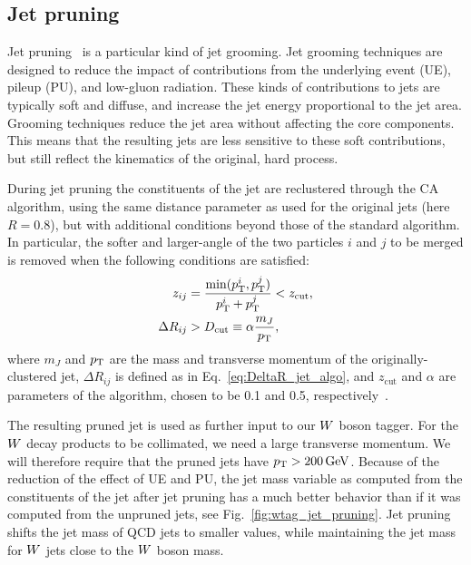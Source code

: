 
\subsection{Jet pruning}

Jet pruning~\cite{Ellis:2009su,Ellis:2009me} is a particular kind of jet grooming. Jet grooming
techniques are designed to reduce the impact of contributions from the underlying event (UE), pileup
(PU), and low-\pt gluon radiation. These kinds of contributions to jets are typically soft and
diffuse, and increase the jet energy proportional to the jet area. Grooming techniques reduce the
jet area without affecting the core components. This means that the resulting jets are less
sensitive to these soft contributions, but still reflect the kinematics of the original, hard
process.


During jet pruning the constituents of the jet are reclustered through the CA algorithm, using the
same distance parameter as used for the original jets (here $R=0.8$), but with additional conditions
beyond those of the standard algorithm.
In particular, the softer and larger-angle of the two particles $i$ and $j$ to be merged is removed
when the following conditions are satisfied:
\begin{align}
  z_{ij} &= \frac{\min( p_{\mathrm{T}}^i , p_{\mathrm{T}}^j )}{p_{\mathrm{T}}^i + p_{\mathrm{T}}^j} < z_{\textrm{cut}}, \\
  \Delta R_{ij} &> D_{\textrm{cut}} \equiv \alpha \frac{m_J}{p_{\mathrm{T}}} ,
\end{align}
where $m_J$ and $p_{\mathrm{T}}$ are the mass and transverse momentum of the originally-clustered jet, $\Delta
R_{ij}$ is defined as in Eq.~\ref{eq:DeltaR_jet_algo}, and
$z_\textrm{cut}$ and $\alpha$ are parameters of the algorithm, chosen to be 0.1 and 0.5,
respectively~\cite{Chatrchyan:2013vbb}. 

The resulting pruned jet is used as further input to our $W$ boson tagger. For the $W$ decay
products to be collimated, we need a large transverse momentum. We will therefore require that the
pruned jets have $p_{\mathrm{T}} > 200\,\text{Ge\hspace{-.08em}V}$. 
Because of the reduction of the effect of UE and PU, the jet mass variable as computed from the
constituents of the jet after jet pruning has a much better behavior than if it was computed from
the unpruned jets, see Fig.~\ref{fig:wtag_jet_pruning}. Jet pruning shifts the jet mass of QCD jets
to smaller values, while maintaining the jet mass for $W$ jets close to the $W$ boson mass.

